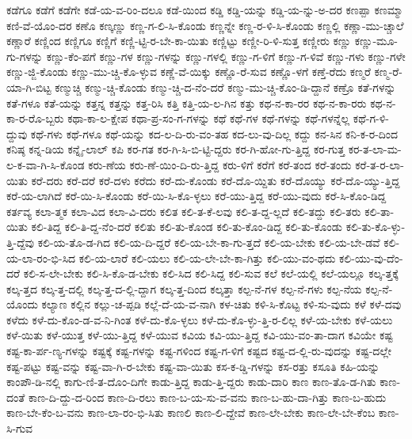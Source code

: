 {ಕಡೆಗೂ
ಕಡೆಗೆ
ಕಡೆಗೇ
ಕಡೆ-ಯ-ವ-ರಿಂ-ದಲೂ
ಕಡೆ-ಯಿಂದ
ಕಡ್ಡಿ
ಕಡ್ಡಿ-ಯನ್ನು
ಕಡ್ಡಿ-ಯ-ನ್ನು-ಅ-ದರ
ಕಣಪ್ಪಾ
ಕಣಮ್ಮಾ
ಕಣಿ-ವೆ-ಯೊಂ-ದರ
ಕಣೊ
ಕಣ್ಕಣ್ಣು
ಕಣ್ಣ-ಗ-ಲಿ-ಸಿ-ಕೊಂಡು
ಕಣ್ಣನ್ನೇ
ಕಣ್ಣ-ರ-ಳಿ-ಸಿ-ಕೊಂಡು
ಕಣ್ಣಲ್ಲಿ
ಕಣ್ಣಾ-ಮು-ಚ್ಚಾಲೆ
ಕಣ್ಣಾರೆ
ಕಣ್ಣಿಂದ
ಕಣ್ಣಿಗೂ
ಕಣ್ಣಿಗೆ
ಕಣ್ಣಿ-ಟ್ಟಿ-ರ-ಬೇ-ಕಾ-ಯಿತು
ಕಣ್ಣಿಟ್ಟು
ಕಣ್ಣೀ-ರಿ-ಳಿ-ಸುತ್ತ
ಕಣ್ಣೀರು
ಕಣ್ಣು
ಕಣ್ಣು-ಮೂ-ಗು-ಗಳನ್ನು
ಕಣ್ಣು-ಕೆಂ-ಪಗೆ
ಕಣ್ಣು-ಗಳ
ಕಣ್ಣು-ಗಳನ್ನು
ಕಣ್ಣು-ಗಳಲ್ಲಿ
ಕಣ್ಣು-ಗ-ಳಿಗೆ
ಕಣ್ಣು-ಗ-ಳಿವೆ
ಕಣ್ಣು-ಗಳು
ಕಣ್ಣು-ಗಳೇ
ಕಣ್ಣು-ಜ್ಜಿ-ಕೊಂಡು
ಕಣ್ಣು-ಮು-ಚ್ಚಿ-ಕೊ-ಳ್ಳುವ
ಕಣ್ಣೆ-ವೆ-ಯಿಕ್ಕು
ಕಣ್ಣೊ-ರೆ-ಸುವ
ಕಣ್ಣೊ-ಳಗೆ
ಕಣ್ತೆ-ರೆದು
ಕಣ್ಮರೆ
ಕಣ್ಮ-ರೆ-ಯಾ-ಗಿ-ಬಿಟ್ಟ
ಕಣ್ಮುಚ್ಚಿ
ಕಣ್ಮು-ಚ್ಚಿ-ಕೊಂಡು
ಕಣ್ಮು-ಚ್ಚಿ-ದ-ನೆಂ-ದರೆ
ಕಣ್ಮು-ಮು-ಚ್ಚಿ-ಕೊಂ-ಡಿ-ದ್ದಾನೆ
ಕಣ್ರೊ
ಕತೆ-ಗಳನ್ನು
ಕತೆ-ಗಳೂ
ಕತೆ-ಯನ್ನು
ಕತ್ತನ್ನ
ಕತ್ತನ್ನು
ಕತ್ತ-ರಿಸಿ
ಕತ್ತಿ
ಕತ್ತಿ-ಯ-ಲ-ಗಿನ
ಕತ್ತು
ಕಥ-ನ-ಕಾ-ರರ
ಕಥ-ನ-ಕಾ-ರರು
ಕಥ-ನ-ಕಾ-ರ-ರೊ-ಬ್ಬರು
ಕಥಾ-ಕಾ-ಲ-ಕ್ಷೇಪ
ಕಥಾ-ಪ್ರ-ಸಂ-ಗ-ಗಳನ್ನು
ಕಥೆ
ಕಥೆ-ಗಳ
ಕಥೆ-ಗಳನ್ನು
ಕಥೆ-ಗಳನ್ನೆಲ್ಲ
ಕಥೆ-ಗ-ಳಿ-ದ್ದುವು
ಕಥೆ-ಗಳು
ಕಥೆ-ಗಳೂ
ಕಥೆ-ಯನ್ನು
ಕದ-ಲ-ದಿ-ರು-ವಂ-ತಹ
ಕದ-ಲು-ವು-ದಿಲ್ಲ
ಕದ್ದು
ಕನ-ಸಿನ
ಕನಿ-ಕ-ರ-ದಿಂದ
ಕನಿಷ್ಠ
ಕನ್ನ-ಡಿಯ
ಕನ್ನೈ-ಲಾಲ್
ಕಪಿ
ಕರ-ಗತ
ಕರ-ಗಿ-ಸಿ-ಬಿ-ಟ್ಟಿ-ದ್ದರು
ಕರ-ಗಿ-ಹೋ-ಗು-ತ್ತಿದ್ದ
ಕರ-ಗುತ್ತ
ಕರ-ತ-ಲಾ-ಮ-ಲ-ಕ-ವಾ-ಗಿ-ಸಿ-ಕೊಂಡ
ಕರು-ಣೆಯ
ಕರು-ಣೆ-ಯಿಂ-ದಿ-ರು-ತ್ತಿದ್ದ
ಕರು-ಳಿಗೆ
ಕರೆಗೆ
ಕರೆ-ತಂದ
ಕರೆ-ತಂದು
ಕರೆ-ತ-ರ-ಲಾ-ಯಿತು
ಕರೆ-ದರು
ಕರೆ-ದರೆ
ಕರೆ-ದಳು
ಕರೆದು
ಕರೆ-ದು-ಕೊಂಡು
ಕರೆ-ದೊ-ಯ್ದಿತು
ಕರೆ-ದೊಯ್ಯು
ಕರೆ-ದೊ-ಯ್ಯು-ತ್ತಿದ್ದ
ಕರೆ-ಯ-ಲಾಗಿದೆ
ಕರೆ-ಯಿ-ಸಿ-ಕೊಂಡು
ಕರೆ-ಯಿ-ಸಿ-ಕೊ-ಳ್ಳಲು
ಕರೆ-ಯು-ತ್ತಿದ್ದ
ಕರೆ-ಯು-ವುದು
ಕರೆ-ಸಿ-ಕೊಂ-ಡಿದ್ದ
ಕರ್ತವ್ಯ
ಕಲಾ-ತ್ಮಕ
ಕಲಾ-ವಿದ
ಕಲಾ-ವಿ-ದರು
ಕಲಿತ
ಕಲಿ-ತ-ಕೆ-ಲವು
ಕಲಿ-ತ-ದ್ದ-ಲ್ಲದೆ
ಕಲಿ-ತದ್ದು
ಕಲಿ-ತರು
ಕಲಿ-ತಾ-ಯಿತು
ಕಲಿ-ತಿದ್ದ
ಕಲಿ-ತಿ-ದ್ದ-ನೆಂ-ದರೆ
ಕಲಿತು
ಕಲಿ-ತು-ಕೊಂಡ
ಕಲಿ-ತು-ಕೊಂ-ಡಿದ್ದ
ಕಲಿ-ತು-ಕೊಂಡು
ಕಲಿ-ತು-ಕೊ-ಳ್ಳು-ತ್ತಿ-ದ್ದೆವು
ಕಲಿ-ಯ-ತೊ-ಡ-ಗಿದ
ಕಲಿ-ಯ-ದಿ-ದ್ದರೆ
ಕಲಿ-ಯ-ಬೇ-ಕಾ-ಗು-ತ್ತದೆ
ಕಲಿ-ಯ-ಬೇಕು
ಕಲಿ-ಯ-ಬೇ-ಡವೆ
ಕಲಿ-ಯ-ಲಾ-ರಂ-ಭಿ-ಸಿದ
ಕಲಿ-ಯ-ಲಾರೆ
ಕಲಿ-ಯಲು
ಕಲಿ-ಯ-ಲೇ-ಬೇ-ಕಾ-ಗಿತ್ತು
ಕಲಿ-ಯು-ವಂ-ಥದು
ಕಲಿ-ಯು-ವು-ದೆಂ-ದರೆ
ಕಲಿ-ಸ-ಲೇ-ಬೇಕು
ಕಲಿ-ಸಿ-ಕೊ-ಡ-ಬೇಕು
ಕಲಿ-ಸಿದ
ಕಲಿ-ಸಿದ್ದ
ಕಲಿ-ಸುವ
ಕಲೆ
ಕಲೆ-ಯಲ್ಲಿ
ಕಲೆ-ಯಲ್ಲೂ
ಕಲ್ಕ-ತ್ತಕ್ಕೆ
ಕಲ್ಕ-ತ್ತದ
ಕಲ್ಕ-ತ್ತ-ದಲ್ಲಿ
ಕಲ್ಕ-ತ್ತ-ದ-ಲ್ಲಿ-ದ್ದಾಗ
ಕಲ್ಕ-ತ್ತ-ದಿಂದ
ಕಲ್ಕತ್ತಾ
ಕಲ್ಪ-ನೆ-ಗಳ
ಕಲ್ಪ-ನೆ-ಗಳು
ಕಲ್ಪ-ನೆಯ
ಕಲ್ಪ-ನೆ-ಯೊಂದು
ಕಲ್ಯಾಣ
ಕಲ್ಲಿನ
ಕಲ್ಲು-ಚ-ಪ್ಪಡಿ
ಕಲ್ಲೆ-ದೆ-ಯ-ವ-ನಾಗಿ
ಕಳ-ಚಿತು
ಕಳಿ-ಸಿ-ಕೊಟ್ಟ
ಕಳಿ-ಸು-ವುದು
ಕಳೆ
ಕಳೆ-ದವು
ಕಳೆದು
ಕಳೆ-ದು-ಕೊಂ-ಡ-ವ-ನಿ-ಗಿಂತ
ಕಳೆ-ದು-ಕೊ-ಳ್ಳಲು
ಕಳೆ-ದು-ಕೊ-ಳ್ಳು-ತ್ತಿ-ರ-ಲಿಲ್ಲ
ಕಳೆ-ಯ-ಬೇಕು
ಕಳೆ-ಯಲು
ಕಳೆ-ಯಿತು
ಕಳೆ-ಯುತ್ತ
ಕಳೆ-ಯು-ತ್ತಿದ್ದ
ಕಳೆ-ಯುವ
ಕವಿಯ
ಕವಿ-ಯು-ತ್ತಿದ್ದ
ಕವಿ-ಯು-ವಂ-ತಾ-ದಾಗ
ಕವಿಯೇ
ಕಷ್ಟ
ಕಷ್ಟ-ಕಾ-ರ್ಪ-ಣ್ಯ-ಗಳನ್ನು
ಕಷ್ಟಕ್ಕೆ
ಕಷ್ಟ-ಗಳನ್ನು
ಕಷ್ಟ-ಗಳಿಂದ
ಕಷ್ಟ-ಗ-ಳಿಗೆ
ಕಷ್ಟದ
ಕಷ್ಟ-ದ-ಲ್ಲಿ-ರು-ವುದನ್ನು
ಕಷ್ಟ-ದಲ್ಲೇ
ಕಷ್ಟ-ಪಟ್ಟು
ಕಷ್ಟ-ವನ್ನು
ಕಷ್ಟ-ವಾ-ಗಿ-ರ-ಬೇಕು
ಕಷ್ಟ-ವಾ-ಯಿತು
ಕಸ-ಕ-ಡ್ಡಿ-ಗಳನ್ನು
ಕಸ-ರತ್ತು
ಕಸೂತಿ
ಕಹಿ-ಯನ್ನು
ಕಾಂಪೌ-ಡಿ-ನಲ್ಲಿ
ಕಾಗು-ಣಿ-ತ-ದೊಂ-ದಿಗೇ
ಕಾಡು-ತ್ತಿದ್ದ
ಕಾಡು-ತ್ತಿ-ದ್ದರು
ಕಾಡು-ದಾರಿ
ಕಾಣ
ಕಾಣ-ತೊ-ಡ-ಗಿತು
ಕಾಣ-ದಂತೆ
ಕಾಣ-ದಿ-ದ್ದು-ದ-ರಿಂದ
ಕಾಣ-ದಿ-ರಲು
ಕಾಣ-ಬ-ಯ-ಸು-ವ-ವನು
ಕಾಣ-ಬ-ಹು-ದಾ-ಗಿತ್ತು
ಕಾಣ-ಬ-ಹುದು
ಕಾಣ-ಬೇ-ಕೆಂ-ಬ-ವನು
ಕಾಣ-ಲಾ-ರಂ-ಭಿ-ಸಿತು
ಕಾಣಲಿ
ಕಾಣ-ಲಿ-ದ್ದೇವೆ
ಕಾಣ-ಲೇ-ಬೇಕು
ಕಾಣ-ಲೇ-ಬೇ-ಕೆಂಬ
ಕಾಣ-ಸಿ-ಗುವ
}
